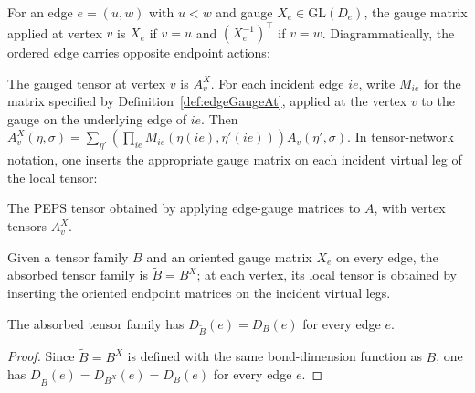\begin{definition}%
    \label{def:edgeGaugeAt}
    \leanok
    For an edge $e = (u,w)$ with $u < w$ and gauge $X_e \in \mathrm{GL}(D_e)$,
    the gauge matrix applied at vertex $v$ is $X_e$ if $v = u$ and
    $(X_e^{-1})^\top$ if $v = w$.
    Diagrammatically, the ordered edge carries opposite endpoint actions:
    \begin{center}
        \TNPEPSEdgeGaugeOrientation
    \end{center}
\end{definition}

\begin{definition}%
    \label{def:gaugeVertex}
    \leanok
    The gauged tensor at vertex $v$ is $A^X_v$. For each incident edge $ie$,
    write $M_{ie}$ for the matrix specified by
    Definition~\ref{def:edgeGaugeAt}, applied at the vertex $v$ to the gauge
    on the underlying edge of $ie$. Then
    $A^X_v(\eta, \sigma)
        = \sum_{\eta'} (\prod_{ie} M_{ie}(\eta(ie), \eta'(ie)))
        A_v(\eta', \sigma)$.
    In tensor-network notation, one inserts the appropriate gauge matrix on
    each incident virtual leg of the local tensor:
    \begin{center}
        \TNPEPSGaugeVertexAction
    \end{center}
\end{definition}

\begin{definition}%
    \label{def:applyGauge}
    \leanok
    The PEPS tensor obtained by applying edge-gauge matrices to $A$, with
    vertex tensors $A^X_v$.
\end{definition}

\begin{definition}%
    \label{def:peps_absorbEdgeGauges}
    \leanok
    Given a tensor family $B$ and an oriented gauge matrix $X_e$ on every edge,
    the absorbed tensor family is $\widetilde B=B^X$; at each vertex, its
    local tensor is obtained by inserting the oriented endpoint matrices on
    the incident virtual legs.
\end{definition}

\begin{theorem}%
    \label{thm:peps_absorbEdgeGauges_bondDim}
    \leanok
    The absorbed tensor family has $D_{\widetilde B}(e)=D_B(e)$ for every
    edge $e$.
\end{theorem}
\begin{proof}\leanok
    Since $\widetilde B=B^X$ is defined with the same bond-dimension function as
    $B$, one has $D_{\widetilde B}(e)=D_{B^X}(e)=D_B(e)$ for every edge $e$.
\end{proof}

